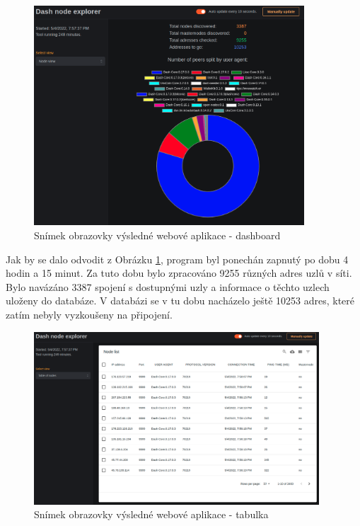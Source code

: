 \documentclass[12pt]{article}
\begin{document}
\begin{figure}[ht]
	\centering
	\includegraphics[width=0.90\textwidth]{img/web_app.png}
	\caption{Snímek obrazovky výsledné webové aplikace - dashboard}
	\label{fig:web_app_1}
\end{figure}

\noindent Jak by se dalo odvodit z Obrázku \ref{fig:web_app_1}, program byl ponechán zapnutý po dobu 4 hodin a 15 minut. Za tuto dobu bylo zpracováno 9255 různých adres uzlů v síti. Bylo navázáno 3387 spojení s dostupnými uzly a informace o těchto uzlech uloženy do databáze. V databázi se v tu dobu nacházelo ještě 10253 adres, které zatím nebyly vyzkoušeny na připojení.

\newpage

\begin{figure}[ht]
	\centering
	\includegraphics[width=0.95\textwidth]{img/web_app_2.png}
	\caption{Snímek obrazovky výsledné webové aplikace - tabulka}
	\label{fig:web_app_2}
\end{figure}
\end{document}
